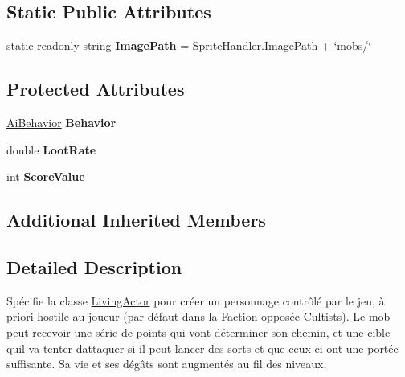 \subsection*{Static Public Attributes}
\begin{DoxyCompactItemize}
\item 
\mbox{\label{class_tentacle_slicers_1_1actors_1_1_mob_a9678bb1de8dc88e04ba7504ddea5f0c7}} 
static readonly string {\bfseries Image\+Path} = Sprite\+Handler.\+Image\+Path + \char`\"{}mobs/\char`\"{}
\end{DoxyCompactItemize}
\subsection*{Protected Attributes}
\begin{DoxyCompactItemize}
\item 
\mbox{\label{class_tentacle_slicers_1_1actors_1_1_mob_a908ccd33e3ebd894a974645dacb860b9}} 
\hyperlink{class_tentacle_slicers_1_1_a_i_1_1_ai_behavior}{Ai\+Behavior} {\bfseries Behavior}
\item 
\mbox{\label{class_tentacle_slicers_1_1actors_1_1_mob_afde15cb04d735d384313b6f3bbc0f283}} 
double {\bfseries Loot\+Rate}
\item 
\mbox{\label{class_tentacle_slicers_1_1actors_1_1_mob_aa0bfff04216bf5f92fa330789eee4854}} 
int {\bfseries Score\+Value}
\end{DoxyCompactItemize}
\subsection*{Additional Inherited Members}


\subsection{Detailed Description}
Spécifie la classe \hyperlink{class_tentacle_slicers_1_1actors_1_1_living_actor}{Living\+Actor} pour créer un personnage contrôlé par le jeu, à priori hostile au joueur (par défaut dans la Faction opposée Cultists). Le mob peut recevoir une série de points qui vont déterminer son chemin, et une cible qu\textquotesingle{}il va tenter d\textquotesingle{}attaquer si il peut lancer des sorts et que ceux-\/ci ont une portée suffisante. Sa vie et ses dégâts sont augmentés au fil des niveaux. 



